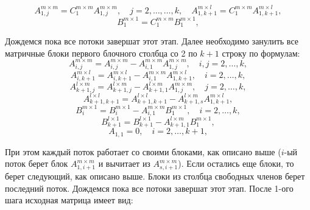 \documentclass[a4paper,12pt]{article}
\begin{document}
$$
    A^{m \times m}_{1,j} = C^{m \times m}_1A^{m \times m}_{1,j}, \quad j=2,\dots,\dots,k, \quad A^{m \times l}_{1, k+1} = C^{m \times m}_1A^{m \times l}_{1,k+1},
$$
$$
    B^{m \times 1}_1 = C^{m \times m}_1B^{m \times 1}_1,
$$

Дождемся пока все потоки завершат этот этап. Далее необходимо занулить все матричные блоки первого блочного столбца со 2 по $k+1$ строку по формулам:
$$
    A^{m \times m}_{i,j} = A^{m \times m}_{i,j} - A^{m \times m}_{i,1}A^{m \times m}_{1,j}, \quad i,j=2,\dots,k,
$$
$$
    A^{m \times l}_{i, k+1} = A^{m \times l}_{i, k+1} - A^{m \times m}_{i, 1}A^{m \times l}_{1, k+1}, \quad i=2,\dots,k,
$$
$$
    A^{l \times m}_{k+1, j} = A^{l \times m}_{k+1, j} - A^{l \times m}_{k+1, 1}A^{m \times m}_{1, j}, \quad j=2,\dots,k,
$$
$$
    A^{l \times l}_{k+1, k+1} = A^{l \times l}_{k+1, k+1} - A^{l \times m}_{k+1, s}A^{m \times l}_{1, k+1},
$$
$$
    B^{m \times 1}_i = B^{m \times 1}_i - A^{m \times m}_{i,1}B^{m \times 1}_1, \quad i=2,\dots,k,
$$
$$
    B^{l \times 1}_{k+1} = B^{l \times 1}_{k+1} - A^{l \times m}_{k+1, 1}B^{m \times 1}_1,
$$
$$
  A_{1,1}=0, \quad i=2,\dots,k+1,  
$$

При этом каждый поток работает со своими блоками, как описано выше ($i$-ый поток берет блок $A^{m \times m}_{1, i + 1}$ и вычитает из $A^{m \times m}_{s, i + 1}$). Если остались еще блоки, то берет следующий, как описано выше. Блоки из столбца свободных членов берет последний поток. Дождемся пока все потоки завершат этот этап. После 1-ого шага исходная матрица имеет вид:
\end{document}
